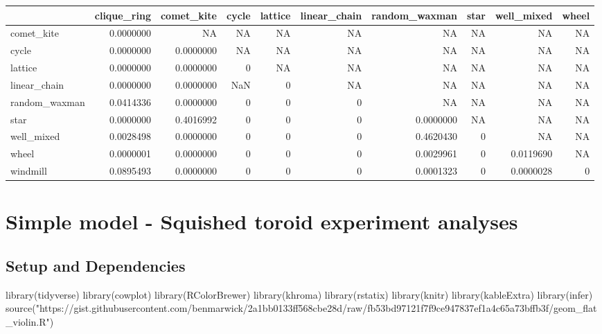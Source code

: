 \documentclass[
]{book}
\newenvironment{Shaded}{\begin{snugshade}}{\end{snugshade}}
\newcommand{\FunctionTok}[1]{\textcolor[rgb]{0.00,0.00,0.00}{#1}}
\newcommand{\NormalTok}[1]{#1}
\newcommand{\StringTok}[1]{\textcolor[rgb]{0.31,0.60,0.02}{#1}}
\begin{document}
\begin{table}
\centering
\begin{tabular}[t]{l|r|r|r|r|r|r|r|r|r}
\hline
  & clique\_ring & comet\_kite & cycle & lattice & linear\_chain & random\_waxman & star & well\_mixed & wheel\\
\hline
comet\_kite & 0.0000000 & NA & NA & NA & NA & NA & NA & NA & NA\\
\hline
cycle & 0.0000000 & 0.0000000 & NA & NA & NA & NA & NA & NA & NA\\
\hline
lattice & 0.0000000 & 0.0000000 & 0 & NA & NA & NA & NA & NA & NA\\
\hline
linear\_chain & 0.0000000 & 0.0000000 & NaN & 0 & NA & NA & NA & NA & NA\\
\hline
random\_waxman & 0.0414336 & 0.0000000 & 0 & 0 & 0 & NA & NA & NA & NA\\
\hline
star & 0.0000000 & 0.4016992 & 0 & 0 & 0 & 0.0000000 & NA & NA & NA\\
\hline
well\_mixed & 0.0028498 & 0.0000000 & 0 & 0 & 0 & 0.4620430 & 0 & NA & NA\\
\hline
wheel & 0.0000001 & 0.0000000 & 0 & 0 & 0 & 0.0029961 & 0 & 0.0119690 & NA\\
\hline
windmill & 0.0895493 & 0.0000000 & 0 & 0 & 0 & 0.0001323 & 0 & 0.0000028 & 0\\
\hline
\end{tabular}
\end{table}

\hypertarget{simple-model---squished-toroid-experiment-analyses}{%
\chapter{Simple model - Squished toroid experiment analyses}\label{simple-model---squished-toroid-experiment-analyses}}

\hypertarget{setup-and-dependencies}{%
\section{Setup and Dependencies}\label{setup-and-dependencies}}

\begin{Shaded}
\begin{Highlighting}[]
\FunctionTok{library}\NormalTok{(tidyverse)}
\FunctionTok{library}\NormalTok{(cowplot)}
\FunctionTok{library}\NormalTok{(RColorBrewer)}
\FunctionTok{library}\NormalTok{(khroma)}
\FunctionTok{library}\NormalTok{(rstatix)}
\FunctionTok{library}\NormalTok{(knitr)}
\FunctionTok{library}\NormalTok{(kableExtra)}
\FunctionTok{library}\NormalTok{(infer)}
\FunctionTok{source}\NormalTok{(}\StringTok{"https://gist.githubusercontent.com/benmarwick/2a1bb0133ff568cbe28d/raw/fb53bd97121f7f9ce947837ef1a4c65a73bffb3f/geom\_flat\_violin.R"}\NormalTok{)}
\end{Highlighting}
\end{Shaded}
\end{document}
